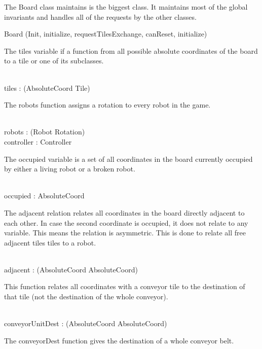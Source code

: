 \documentclass[12pt]{article}
\begin{document}
The Board class maintains is the biggest class. It maintains most of the global invariants and handles all of the requests by the other classes.
\begin{class}{Board}
\upharpoonright (Init, initialize, requestTilesExchange, canReset, initialize) \\
\begin{nobottomstate}
\begin{zpar}
The tiles variable if a function from all possible absolute coordinates of the board to a tile or one of its subclasses.
\end{zpar} \\
tiles : \power (AbsoluteCoord \fun \: \downarrow \! Tile) \\
\also \also \also
\begin{zpar}
The robots function assigns a rotation to every robot in the game.
\end{zpar} \\
robots : \power (Robot \pfun Rotation) \\
\also \also \also
controller : Controller \\
\also \also \also
\begin{zpar}
The occupied variable is a set of all coordinates in the board currently occupied by either a living robot or a broken robot.
\end{zpar} \\
occupied : \power AbsoluteCoord \\
\also \also \also
\begin{zpar}
The adjacent relation relates all coordinates in the board directly adjacent to each other. In case the second coordinate is occupied, it does not relate to any variable.
This means the relation is asymmetric. This is done to relate all free adjacent tiles tiles to a robot.
\end{zpar} \\
adjacent : \power (AbsoluteCoord \rel AbsoluteCoord) \\
\also \also \also
\begin{zpar}
This function relates all coordinates with a conveyor tile to the destination of that tile (not the destination of the whole conveyor).
\end{zpar} \\
conveyorUnitDest : \power (AbsoluteCoord \pinj AbsoluteCoord) \\
\also \also \also
\begin{zpar}
The conveyorDest function gives the destination of a whole conveyor belt.

\end{zpar}
\end{nobottomstate}
\end{class}
\end{document}

